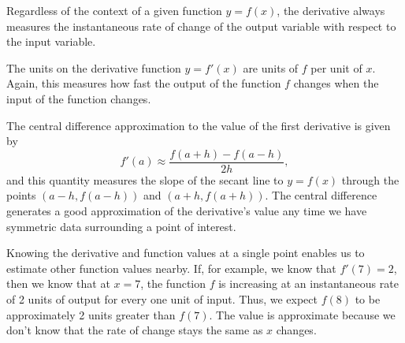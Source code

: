 \begin{summary}
\item Regardless of the context of a given function $y=f(x)$, the derivative always measures the instantaneous rate of change of the output variable with respect to the input variable.
\item The units on the derivative function $y = f'(x)$ are units of $f$ per unit of $x$.  Again, this measures how fast the output of the function $f$ changes when the input of the function changes.
\item The central difference approximation to the value of the first derivative is given by 
$$f'(a) \approx \frac{f(a+h) - f(a-h)}{2h},$$
and this quantity measures the slope of the secant line to $y = f(x)$ through the points $(a-h, f(a-h))$ and $(a+h, f(a+h))$.  The central difference generates a good approximation of the derivative's value any time we have symmetric data surrounding a point of interest.
\item Knowing the derivative and function values at a single point enables us to estimate other function values nearby.  If, for example, we know that $f'(7) = 2$, then we know that at $x = 7$, the function $f$ is increasing at an instantaneous rate of 2 units of output for every one unit of input.  Thus, we expect $f(8)$ to be approximately 2 units greater than $f(7)$.  The value is approximate because we don't know that the rate of change stays the same as $x$ changes.
\end{summary}

\nin \hrulefill

 

\clearpage

